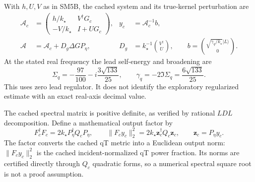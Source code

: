 With $h,U,V$ as in SM5B, the cached system and its true-kernel perturbation are
\begin{align}
 \mathcal A_c&=
 \begin{pmatrix}h/k_\star&V^\dagger G_c\\-V/k_\star&I+UG_c\end{pmatrix},
 &y_c&=\mathcal A_c^{-1}b,\nonumber\\
 \mathcal A&=\mathcal A_c+D_g\Delta G P_\eta,
 &D_g&=k_\star^{-1}\binom{V^\dagger}{U},
 \qquad b=\binom{\sqrt{\gamma_q/k_\star}|L\rangle}{0}.
 \label{eq:sm-ramp-full-response}
\end{align}
At the stated real frequency the lead self-energy and broadening are
\begin{equation}
 \Sigma_q=-\frac{97}{100}-i\frac{3\sqrt{133}}{25},
 \qquad \gamma_q=-2\Im\Sigma_q=\frac{6\sqrt{133}}{25}.
 \label{eq:sm-ramp-real-lead}
\end{equation}
This uses zero lead regulator. It does not identify the exploratory regularized estimate with an exact real-axis decimal value.

The cached spectral matrix is positive definite, as verified by rational $LDL$ decomposition. Define a mathematical output factor by
\begin{equation}
 F_c^\dagger F_c=2k_\star P_\eta^\dagger Q_cP_\eta,
 \qquad \|F_cy_c\|_2^2=2k_\star\bm z_c^\dagger Q_c\bm z_c,
 \qquad \bm z_c=P_\eta y_c.
 \label{eq:sm-ramp-output-factor}
\end{equation}
The factor converts the cached qT metric into a Euclidean output norm: $\|F_cy_c\|_2^2$ is the cached incident-normalized qT power fraction. Its norms are certified directly through $Q_c$ quadratic forms, so a numerical spectral square root is not a proof assumption.

